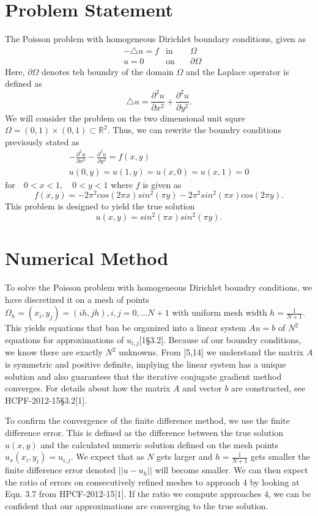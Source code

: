 \documentclass[11pt]{article}
\begin{document}
\section{Problem Statement}
The Poisson problem with homogeneous Dirichlet boundary conditions, given as
\begin{align*}
&-\triangle u=f &\text{in}\hspace{1em}& \Omega\\
&u=0            &\text{on}\hspace{1em}& \partial\Omega
\end{align*}
Here, $\partial\Omega$ denotes teh boundry of the domain $\Omega$ and the Laplace operator is defined as
$$\triangle u=\frac{\partial ^2 u}{\partial x^2}+\frac{\partial ^2 u}{\partial y^2}.$$
We will consider the problem on the two dimensional unit squre $\Omega=(0,1)\times (0,1)\subset \mathbb{R}^2$. Thus, we can rewrite the boundry conditions previously stated as
\begin{align*}
&-\frac{\partial ^2 u}{\partial x^2}-\frac{\partial ^2 u}{\partial y^2}=f(x,y)&\\
&u(0,y)=u(1,y)=u(x,0)=u(x,1)=0 &
\end{align*}
$\text{for}\hspace{1em} 0<x<1,\hspace{1em} 0<y<1$ where $f$ is given as
$$f(x,y)=-2\pi ^2 cos(2\pi x)sin^2 (\pi y)-2\pi ^2 sin^2(\pi x)cos(2\pi y).$$
This problem is designed to yield the true solution
$$u(x,y)=sin^2 (\pi x)sin^2 (\pi y).$$
\section{Numerical Method}
To solve the Poisson problem with homogeneous Dirichlet boundry conditions, we have discretized it on a mesh of points $\Omega_h ={(x_i, y_j)=(ih,jh),i,j=0,...N+1}$ with uniform mesh width $h=\frac{1}{N+1}$. This yields equations that ban be organized into a linear system $Au=b$ of $N^2$ equations for approximations of $u_{i,j}$[1\S 3.2]. Because of our boundry conditions, we know there are exactly $N^2$ unknowns. From [5,14] we understand the matrix $A$ is symmetric and positive definite, implying the linear system has a unique solution and also guarantees that the iterative conjugate gradient method converges. For details about how the matrix $A$ and vector $b$ are constructed, see HCPF-2012-15\S3.2[1].

To confirm the convergence of the finite difference method, we use the finite difference error. This is defined as the difference between the true solution $u(x,y)$ and the calculated numeric solution defined on the mesh points $u_x(x_i,y_i)=u_{i,j}$. We expect that as $N$ gets larger and $h=\frac{1}{N+1}$ gets smaller the finite difference error denoted $||u-u_h||$ will become smaller. We can then expect the ratio of errors on consecutively refined meshes to approach $4$ by looking at Eqn. 3.7 from HPCF-2012-15[1]. If the ratio we compute approaches $4$, we can be confident that our approximations are converging to the true solution.
\end{document}
